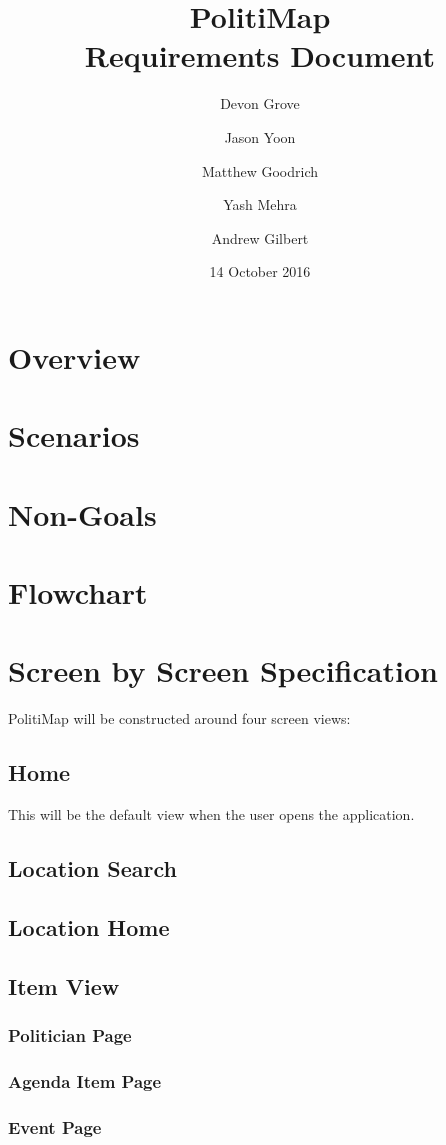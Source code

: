 \documentclass{article}
\title{PolitiMap\\\large Requirements Document}
\author{Devon Grove \and
  Jason Yoon \and
  Matthew Goodrich \and
  Yash Mehra \and
  Andrew Gilbert}
\date{14 October 2016}
\begin{document}
\maketitle
\tableofcontents

\section{Overview}
\section{Scenarios}
\section{Non-Goals}
\section{Flowchart}
\section{Screen by Screen Specification}
PolitiMap will be constructed around four screen views:
\subsection{Home}
This will be the default view when the user opens the application. 
\subsection{Location Search}
\subsection{Location Home}
\subsection{Item View}
\subsubsection{Politician Page}
\subsubsection{Agenda Item Page}
\subsubsection{Event Page}
\end{document}
